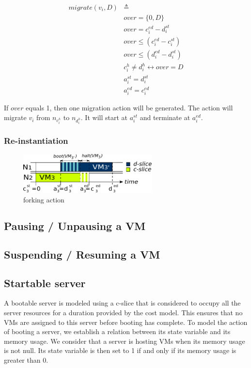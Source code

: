 \begin{equation*}
\begin{split}
migrate(v_i, D) & \triangleq \\
& over = \{0,D\} \\
& over = c_i^{ed} - d_i^{st}\\
& over \leq (c_i^{ed} - c_i^{st})\\
& over \leq (d_i^{ed} - d_i^{st})\\
& c_i^h \neq d_i^h \leftrightarrow over = D\\
& a_i^{st} = d_i^{st} \\
& a_i^{ed} = c_i^{ed}
\end{split}
\end{equation*}

If $over$ equals 1, then one migration action will be generated. The action will migrate $v_i$ from
$n_{c_i^h}$ to $n_{d_i^h}$. It will start at $a_i^{st}$ and terminate at $a_i^{ed}$.

\subsubsection{Re-instantiation}

\begin{figure}[htb]
\centering
\includegraphics[width=7cm]{img/fork_model}
\caption{forking action}\label{fig: fork model}
\end{figure}

\subsection{Pausing / Unpausing a VM}

\subsection{Suspending / Resuming a VM}

\subsection{Startable server}

A bootable server is modeled using a c-slice that is considered to occupy
all the server resources for a duration provided by the cost model.  This
ensures that no VMs are assigned to this server before booting has
complete. To model the action of booting a server, we
establish a relation between its state variable and its memory usage.  We
consider that a server is hosting VMs when its memory usage is not null.
Its state variable is then set to 1 if and only if its memory usage is
greater than 0.

